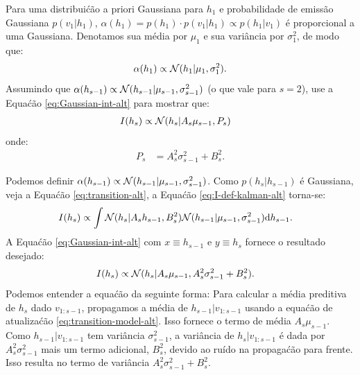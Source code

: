 \begin{exenumerate}
    Para uma distribui\'c\~ao a priori Gaussiana para $h_1$ e probabilidade de emiss\~ao
    Gaussiana $p(v_1 | h_1)$, $\alpha(h_1) = p(h_1) \cdot p(v_1 | h_1)
    \propto p(h_1 | v_1)$ \'e proporcional a uma Gaussiana. Denotamos sua
    m\'edia por $\mu_1$ e sua vari\^ancia por $\sigma_1^2$, de modo que:
    \begin{equation}
        \alpha(h_1) \propto \mathcal{N}(h_1 | \mu_1, \sigma_1^2).
    \end{equation}
    Assumindo que $\alpha(h_{s-1}) \propto \mathcal{N}(h_{s-1} | \mu_{s-1}, \sigma_{s-1}^2)$ (o que vale para $s=2$), use a Equa\'c\~ao \eqref{eq:Gaussian-int-alt} para mostrar que:
    \begin{align}
        I(h_s) & \propto \mathcal{N}(h_s | A_s \mu_{s-1}, P_s)
    \end{align}
    onde:
    \begin{align}
        P_s & = A^2_s \sigma^2_{s-1} + B_s^2.
    \end{align}
    
    \begin{solution}
        Podemos definir $\alpha(h_{s-1}) \propto \mathcal{N}(h_{s-1} | \mu_{s-1}, \sigma_{s-1}^2)$. Como $p(h_s | h_{s-1})$ \'e Gaussiana, veja a Equa\'c\~ao \eqref{eq:transition-alt}, a Equa\'c\~ao \eqref{eq:I-def-kalman-alt} torna-se:
        \begin{align}
            I(h_s) &\propto \int  \mathcal{N}(h_s | A_s h_{s-1}, B^2_s)  \mathcal{N}(h_{s-1} | \mu_{s-1}, \sigma_{s-1}^2) \mathrm{d} h_{s-1}.
        \end{align}
        A Equa\'c\~ao \eqref{eq:Gaussian-int-alt} com $x \equiv h_{s-1}$ e $y \equiv h_s$ fornece o resultado desejado:
        \begin{align}
            I(h_s) &\propto  \mathcal{N}(h_s | A_s \mu_{s-1}, A_s^2 \sigma_{s-1}^2+B_s^2).
            \label{eq:prediction-Gaussian-alt}
        \end{align}
        Podemos entender a equa\'c\~ao da seguinte forma: Para calcular a
        m\'edia preditiva de $h_s $ dado $v_{1:s-1}$, propagamos a
        m\'edia de $h_{s-1} | v_{1:s-1}$ usando a equa\'c\~ao de atualiza\'c\~ao
        \eqref{eq:transition-model-alt}. Isso fornece o termo de m\'edia $A_s
        \mu_{s-1}$. Como $h_{s-1} | v_{1:s-1}$ tem vari\^ancia
        $\sigma_{s-1}^2$, a vari\^ancia de $h_s | v_{1:s-1}$ \'e dada por
        $A_s^2 \sigma_{s-1}^2$ mais um termo adicional, $B_s^2$, devido ao
        ru\'ido na propaga\'c\~ao para frente. Isso resulta no termo de vari\^ancia
        $A_s^2 \sigma_{s-1}^2+B_s^2$.
        

\end{solution}
\end{exenumerate}
